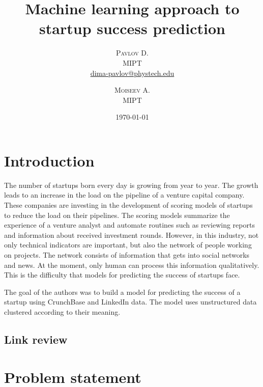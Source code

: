 \documentclass[12pt]{article}
\title{\textbf{\Huge{Machine learning approach to startup success prediction}}}
\author{%
\textsc{Pavlov D.} \\[1ex] 
\normalsize MIPT\\ 
\normalsize \href{mailto:dima-pavlov@phystech.edu}{dima-pavlov@phystech.edu}
\and 
\textsc{Moiseev A.} \\[1ex] 
\normalsize MIPT
}
\date{\today}
\theoremstyle{plain}
\theoremstyle{definition}
\begin{document}
\maketitle

\clearpage

\section{Introduction}



The number of startups born every day is growing from year to year. 
The growth leads to an increase in the load on the pipeline of a venture capital company. 
These companies are investing in the development of scoring models of startups to reduce the load on their pipelines. 
The scoring models summarize the experience of a venture analyst and automate routines such as reviewing reports and information about received investment rounds. %
However, in this industry, not only technical indicators are important, but also the network of people working on projects. 
The network consists of information that gets into social networks and news. 
At the moment, only human can process this information qualitatively. 
This is the difficulty that models for predicting the success of startups face. 

The goal of the authors was to build a model for predicting the success of a startup using CrunchBase and LinkedIn data. 
The model uses unstructured data clustered according to their meaning.

\subsection{Link review}



\section{Problem statement}
\end{document}
